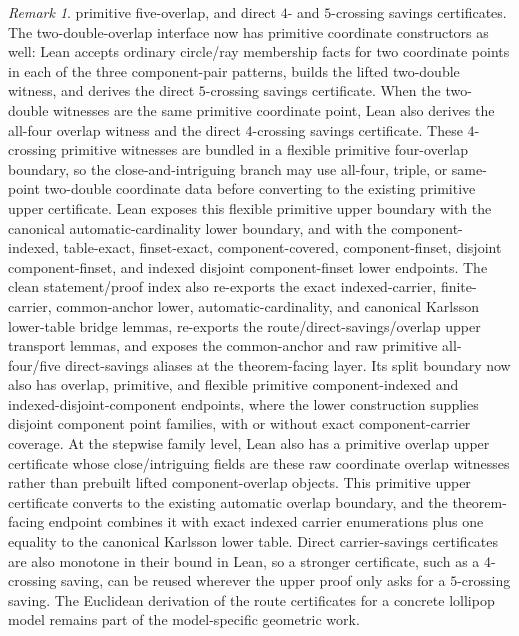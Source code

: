 \documentclass[12pt]{article}
\theoremstyle{plain}
\theoremstyle{definition}
\theoremstyle{remark}
\newtheorem{remark}[theorem]{Remark}
\begin{document}
\begin{remark}
primitive five-overlap, and direct \(4\)- and \(5\)-crossing savings
certificates.  The two-double-overlap interface now has primitive coordinate
constructors as well: Lean accepts ordinary circle/ray membership facts for
two coordinate points in each of the three component-pair patterns, builds the
lifted two-double witness, and derives the direct \(5\)-crossing savings
certificate.  When the two-double witnesses are the same primitive coordinate
point, Lean also derives the all-four overlap witness and the direct
\(4\)-crossing savings certificate.  These \(4\)-crossing primitive witnesses
are bundled in a flexible primitive four-overlap boundary, so the
close-and-intriguing branch may use all-four, triple, or same-point two-double
coordinate data before converting to the existing primitive upper certificate.
Lean exposes this flexible primitive upper boundary with the canonical
automatic-cardinality lower boundary, and with the component-indexed,
table-exact,
finset-exact, component-covered, component-finset, disjoint component-finset,
and indexed disjoint component-finset lower endpoints.
The clean statement/proof index also re-exports the exact indexed-carrier,
finite-carrier, common-anchor lower, automatic-cardinality, and canonical
Karlsson lower-table bridge lemmas, re-exports the route/direct-savings/overlap
upper transport lemmas, and exposes the common-anchor and raw primitive
all-four/five direct-savings aliases at the theorem-facing layer.  Its split
boundary now also has overlap, primitive, and flexible primitive
component-indexed and indexed-disjoint-component endpoints, where the lower
construction supplies disjoint component point families, with or without exact
component-carrier coverage.
At the stepwise family level, Lean also
has a primitive
overlap upper certificate whose close/intriguing fields are these raw
coordinate overlap witnesses rather than prebuilt lifted component-overlap
objects.  This primitive upper certificate converts to the existing automatic
overlap boundary, and the theorem-facing endpoint combines it with exact
indexed carrier enumerations plus one equality to the canonical Karlsson
lower table.
Direct carrier-savings certificates are also monotone in their bound in Lean,
so a stronger certificate, such as a \(4\)-crossing saving, can be reused
wherever the upper proof only asks for a \(5\)-crossing saving.
The
Euclidean derivation of the route certificates for a concrete lollipop model
remains part of the model-specific geometric work.
\end{remark}
\end{document}
